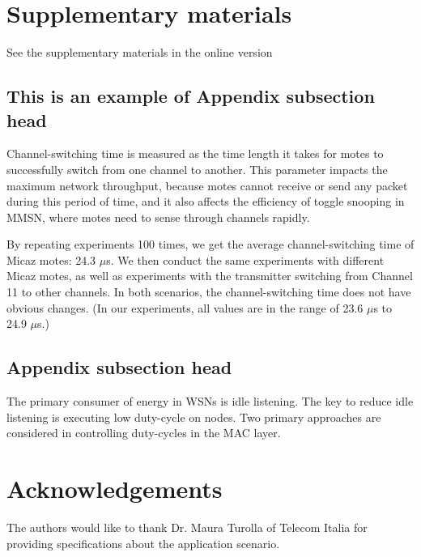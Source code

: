 \section{Supplementary materials}


\begin{printonly}
  See the supplementary materials in the online version
\end{printonly}

\begin{screenonly}
\subsection{This is an example of Appendix subsection head}

Channel-switching time is measured as the time length it takes for
motes to successfully switch from one channel to another. This
parameter impacts the maximum network throughput, because motes
cannot receive or send any packet during this period of time, and it
also affects the efficiency of toggle snooping in MMSN, where motes
need to sense through channels rapidly.

By repeating experiments 100 times, we get the average
channel-switching time of Micaz motes: 24.3 $\mu$s. We then conduct
the same experiments with different Micaz motes, as well as
experiments with the transmitter switching from Channel 11 to other
channels. In both scenarios, the channel-switching time does not have
obvious changes. (In our experiments, all values are in the range of
23.6 $\mu$s to 24.9 $\mu$s.)

\subsection{Appendix subsection head}

The primary consumer of energy in WSNs is idle listening. The key to
reduce idle listening is executing low duty-cycle on nodes. Two
primary approaches are considered in controlling duty-cycles in the
MAC layer.
  
\end{screenonly}

\section*{Acknowledgements}

The authors would like to thank Dr. Maura Turolla of Telecom
Italia for providing specifications about the application scenario.




